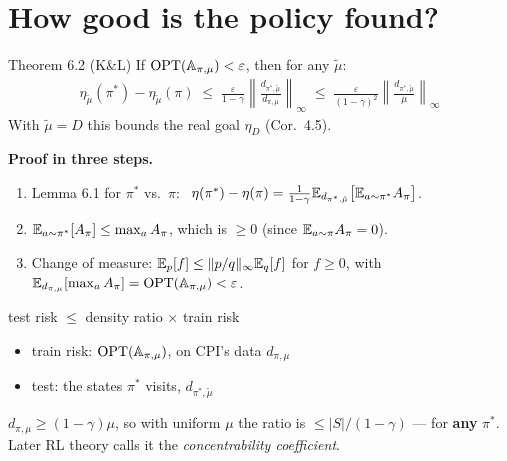 \section{How good is the policy found?}

\begin{thmbox}{Theorem 6.2 (K\&L)}
If $\mathrm{OPT}(\mathbb{A}_{\pi,\mu}) < \varepsilon$, then for any $\tilde\mu$:
\begin{gather*}
  \eta_{\tilde\mu}(\pi^*) - \eta_{\tilde\mu}(\pi)
  \;\le\; \frac{\varepsilon}{1-\gamma}\left\|\frac{d_{\pi^*,\tilde\mu}}{d_{\pi,\mu}}\right\|_\infty
  \;\le\; \frac{\varepsilon}{(1-\gamma)^2}\left\|\frac{d_{\pi^*,\tilde\mu}}{\mu}\right\|_\infty
\end{gather*}
With $\tilde\mu=D$ this bounds the real goal $\eta_D$ (Cor.~4.5).
\end{thmbox}

\textbf{Proof in three steps.}
\begin{enumerate}
  \item Lemma 6.1 for $\pi^*$ vs.\ $\pi$: \ $\eta(\pi^*)-\eta(\pi)=\frac{1}{1-\gamma}\mathbb{E}_{d_{\pi^*,\tilde\mu}}\big[\mathbb{E}_{a\sim\pi^*}A_\pi\big]$.
  \item $\mathbb{E}_{a\sim\pi^*}[A_\pi]\le\max_aA_\pi$, which is $\ge0$ (since $\mathbb{E}_{a\sim\pi}A_\pi=0$).
  \item Change of measure: $\mathbb{E}_p[f]\le\|p/q\|_\infty\mathbb{E}_q[f]$ for $f\ge0$, with $\mathbb{E}_{d_{\pi,\mu}}[\max_aA_\pi]=\mathrm{OPT}(\mathbb{A}_{\pi,\mu})<\varepsilon$.
\end{enumerate}

\begin{pair}
\begin{coolbox}[title={A covariate-shift bound}]
\small test risk $\le$ density ratio $\times$ train risk
\begin{itemize}
  \item train risk: $\mathrm{OPT}(\mathbb{A}_{\pi,\mu})$, on CPI's data $d_{\pi,\mu}$
  \item test: the states $\pi^*$ visits, $d_{\pi^*,\tilde\mu}$
\end{itemize}
\end{coolbox}
\begin{keybox}[title={Uniform $\mu$ caps the ratio}]
\small $d_{\pi,\mu}\ge(1-\gamma)\mu$, so with uniform $\mu$ the ratio is $\le|S|/(1-\gamma)$ --- for \textbf{any} $\pi^*$. Later RL theory calls it the \emph{concentrability coefficient}.
\end{keybox}
\end{pair}

